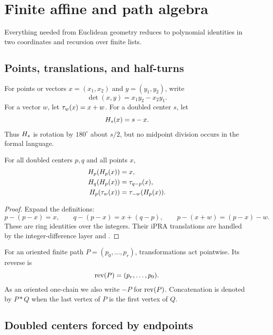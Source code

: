 \section{Finite affine and path algebra}
\label{sec:affine}

Everything needed from Euclidean geometry reduces to polynomial identities in two coordinates and recursion over finite lists.

\subsection{Points, translations, and half-turns}

For points or vectors \(x=(x_1,x_2)\) and \(y=(y_1,y_2)\), write
\[
 \det(x,y)=x_1y_2-x_2y_1.
\]
For a vector \(w\), let \(\tau_{w}(x)=x+w\).  For a doubled center \(s\), let
\[
 H_{s}(x)=s-x.
\]
Thus \(H_{s}\) is rotation by \(180^\circ\) about \(s/2\), but no midpoint division occurs in the formal language.

\begin{lemma}
\label{lem:halfturnalgebra}
For all doubled centers \(p,q\) and all points \(x\),
\begin{align}
 H_{p}(H_{p}(x))&=x,\label{eq:hinv}\\
 H_{q}(H_{p}(x))&=\tau_{q-p}(x),\label{eq:hh}\\
 H_{p}(\tau_{w}(x))&=\tau_{-w}(H_{p}(x)).\label{eq:conjugate}
\end{align}
\end{lemma}
\begin{proof}
Expand the definitions:
\[
 p-(p-x)=x,
 \qquad
 q-(p-x)=x+(q-p),
 \qquad
 p-(x+w)=(p-x)-w.
\]
These are ring identities over the integers.  Their iPRA translations are handled by the integer-difference layer and .
\end{proof}

For an oriented finite path \(P=(p_0,\ldots,p_r)\), transformations act pointwise.  Its reverse is
\[
 \operatorname{rev}(P)=(p_r,\ldots,p_0).
\]
As an oriented one-chain we also write \(-P\) for \(\operatorname{rev}(P)\).  Concatenation is denoted by \(P*Q\) when the last vertex of \(P\) is the first vertex of \(Q\).

\subsection{Doubled centers forced by endpoints}

